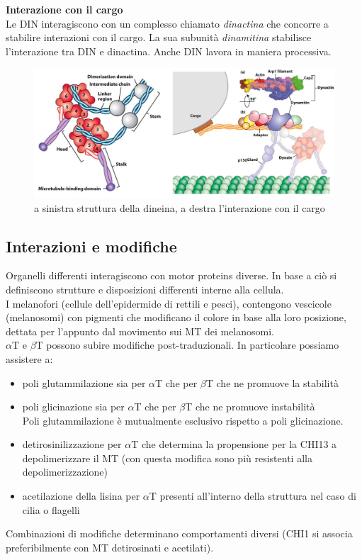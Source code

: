             \textbf{Interazione con il cargo}\\
                Le DIN interagiscono con un complesso chiamato \textit{dinactina} che concorre a stabilire interazioni con il cargo. La sua subunità \textit{dinamitina} stabilisce l'interazione tra DIN e dinactina. Anche DIN lavora in maniera processiva.
                \begin{figure}[h]
                    \centering
                    \includegraphics[width=1\textwidth]{images/dineina.JPG}
                    \caption{\small a sinistra struttura della dineina, a destra l'interazione con il cargo}
                    \label{fig:mesh1}
                \end{figure}
                
        \subsection{Interazioni e modifiche}
            Organelli differenti interagiscono con motor proteins diverse. In base a ciò si definiscono strutture e disposizioni differenti interne alla cellula.\\
            I melanofori (cellule dell'epidermide di rettili e pesci), contengono vescicole (melanosomi) con pigmenti che modificano il colore in base alla loro posizione, dettata per l'appunto dal movimento sui MT dei melanosomi.\\
            
            $\alpha$T e $\beta$T possono subire modifiche post-traduzionali. In particolare possiamo assistere a:
            \begin{itemize}
                \item poli glutammilazione sia per $\alpha$T che per $\beta$T che ne promuove la stabilità
                \item poli glicinazione sia per $\alpha$T che per $\beta$T che ne promuove instabilità\\
                Poli glutammilazione è mutualmente esclusivo rispetto a poli glicinazione.
                \item detirosinilizzazione per $\alpha$T che determina la propensione per la CHI13 a depolimerizzare il MT (con questa modifica sono più resistenti alla depolimerizzazione)
                \item acetilazione della lisina per $\alpha$T presenti all'interno della struttura nel caso di cilia o flagelli
            \end{itemize}
            Combinazioni di modifiche determinano comportamenti diversi (CHI1 si associa preferibilmente con MT detirosinati e acetilati).
        
